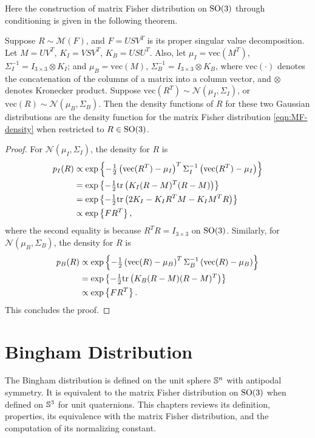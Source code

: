 Here the construction of matrix Fisher distribution on $\mathrm{SO}(3)$ through conditioning is given in the following theorem.
\begin{theorem} \label{thm:MF-construction}
	Suppose $R\sim\mathcal{M}(F)$, and $F=USV^T$ is its proper singular value decomposition.
	Let $M = UV^T$, $K_I = VSV^T$, $K_B = USU^T$.
	Also, let $\mu_I = \mathrm{vec}(M^T)$, $\Sigma_I^{-1} = I_{3\times 3}\otimes K_I$; and $\mu_B = \mathrm{vec}(M)$, $\Sigma_B^{-1} = I_{3\times 3}\otimes K_B$, where $\mathrm{vec}(\cdot)$ denotes the concatenation of the columns of a matrix into a column vector, and $\otimes$ denotes Kronecker product.
	Suppose $\mathrm{vec}(R^T) \sim \mathcal{N}(\mu_I,\Sigma_I)$, or $\mathrm{vec}(R) \sim \mathcal{N}(\mu_B,\Sigma_B)$.
	Then the density functions of $R$ for these two Gaussian distributions are the density function for the matrix Fisher distribution \eqref{eqn:MF-density} when restricted to $R\in\mathrm{SO}(3)$.
\end{theorem}
\begin{proof}
	For $\mathcal{N}(\mu_I,\Sigma_I)$, the density for $R$ is
	\begin{align*}
		p_I(R) &\propto \exp\left\{ -\tfrac{1}{2} \left( \mathrm{vec}(R^T)-\mu_I \right)^T \Sigma_I^{-1} \left( \mathrm{vec}(R^T)-\mu_I \right) \right\} \\
		&= \exp\left\{ -\tfrac{1}{2} \mathrm{tr}\left( K_I(R-M)^T(R-M) \right) \right\} \\
		&= \exp\left\{ -\tfrac{1}{2} \mathrm{tr}\left( 2K_I - K_IR^TM - K_IM^TR \right) \right\} \\
		&\propto \exp\left\{ FR^T \right\},
	\end{align*}
	where the second equality is because $R^TR = I_{3\times 3}$ on $\mathrm{SO}(3)$.
	Similarly, for $\mathcal{N}(\mu_B,\Sigma_B)$, the density for $R$ is
	\begin{align*}
		p_B(R) &\propto \exp\left\{ -\tfrac{1}{2} \left( \mathrm{vec}(R)-\mu_B \right)^T \Sigma_B^{-1} \left( \mathrm{vec}(R)-\mu_B \right) \right\} \\
		&= \exp\left\{ -\tfrac{1}{2} \mathrm{tr}\left( K_B(R-M)(R-M)^T \right) \right\} \\
		&\propto \exp\left\{ FR^T \right\}.
	\end{align*}
	This concludes the proof.
\end{proof}

\section{Bingham Distribution} \label{section:MF-Bingham}

The Bingham distribution is defined on the unit sphere $\mathbb{S}^n$ with antipodal symmetry.
It is equivalent to the matrix Fisher distribution on $\mathrm{SO}(3)$ when defined on $\mathbb{S}^3$ for unit quaternions.
This chapters reviews its definition, properties, its equivalence with the matrix Fisher distribution, and the computation of its normalizing constant.

